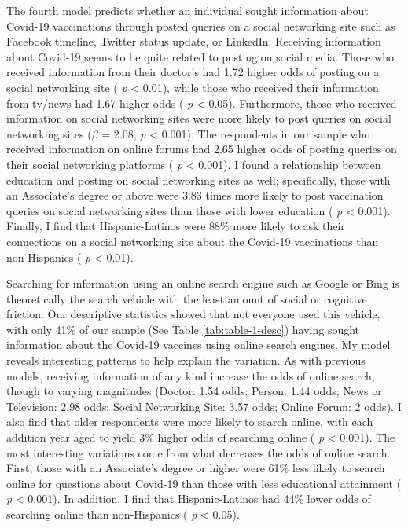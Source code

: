 The fourth model predicts whether an individual sought information about
Covid-19 vaccinations through posted queries on a social networking site such
as Facebook timeline, Twitter status update, or LinkedIn. Receiving information
about Covid-19 seems to be quite related to posting on social media. Those who
received information from their doctor's had
1.72
higher odds of posting on a social networking site ( \emph{p} \textless{} 0.01), while those
who received their information from tv/news had 1.67 higher odds ( \emph{p} \textless{} 0.05).
Furthermore, those who received information on social networking sites were more
likely to post queries on social networking sites (\(\beta\) =
2.08, \emph{p} \textless{} 0.001).
The respondents in our sample who received information on online forums had
2.65
higher odds of posting queries on their social networking platforms ( \emph{p} \textless{} 0.001).
I found a relationship between education and posting on social networking sites
as well; specifically, those with an Associate's degree or above were 3.83 times more likely to post vaccination
queries on social networking sites than those with lower education ( \emph{p} \textless{} 0.001).
Finally, I find that Hispanic-Latinos were
88\%
more likely to ask their connections on a social networking site about the
Covid-19 vaccinations than non-Hispanics ( \emph{p} \textless{} 0.01).

Searching for information using an online search engine such as Google or Bing
is theoretically the search vehicle with the least amount of social or cognitive
friction. Our descriptive statistics showed that not everyone used this vehicle,
with only 41\% of our sample (See Table \ref{tab:table-1-desc}) having sought
information about the Covid-19 vaccines using online search engines. My model
reveals interesting patterns to help explain the variation. As with previous
models, receiving information of any kind increase the odds of online search,
though to varying magnitudes (Doctor:
1.54 odds;
Person:
1.44 odds;
News or Television:
2.98 odds;
Social Networking Site:
3.57 odds;
Online Forum:
2 odds).
I also find that older respondents were more likely to search online, with each
addition year aged to yield
3\%
higher odds of searching online ( \emph{p} \textless{} 0.001). The most interesting variations
come from what decreases the odds of online search. First, those with an
Associate's degree or higher were
61\%
less likely to search online for questions about Covid-19 than those with less
educational attainment ( \emph{p} \textless{} 0.001). In addition, I find that Hispanic-Latinos
had 44\%
lower odds of searching online than non-Hispanics ( \emph{p} \textless{} 0.05).

